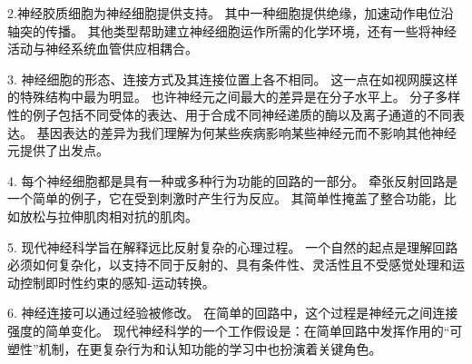 2.神经胶质细胞为神经细胞提供支持。
其中一种细胞提供绝缘，加速动作电位沿轴突的传播。
其他类型帮助建立神经细胞运作所需的化学环境，还有一些将神经活动与神经系统血管供应相耦合。


3. 神经细胞的形态、连接方式及其连接位置上各不相同。 
这一点在如视网膜这样的特殊结构中最为明显。 
也许神经元之间最大的差异是在分子水平上。 
分子多样性的例子包括不同受体的表达、用于合成不同神经递质的酶以及离子通道的不同表达。 
基因表达的差异为我们理解为何某些疾病影响某些神经元而不影响其他神经元提供了出发点。


4. 每个神经细胞都是具有一种或多种行为功能的回路的一部分。
牵张反射回路是一个简单的例子，它在受到刺激时产生行为反应。
其简单性掩盖了整合功能，比如放松与拉伸肌肉相对抗的肌肉。


5. 现代神经科学旨在解释远比反射复杂的心理过程。 
一个自然的起点是理解回路必须如何复杂化，以支持不同于反射的、具有条件性、灵活性且不受感觉处理和运动控制即时性约束的感知-运动转换。


6. 神经连接可以通过经验被修改。
在简单的回路中，这个过程是神经元之间连接强度的简单变化。 
现代神经科学的一个工作假设是：在简单回路中发挥作用的“可塑性”机制，在更复杂行为和认知功能的学习中也扮演着关键角色。


%












